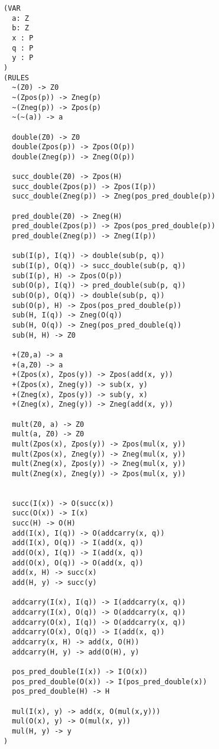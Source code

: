 \begin{lstlisting}[language=trs, caption=Rewriting rule of $\bb{Z}$ and $\bb{P}$ in the TRS format]
(VAR
  a: Z
  b: Z
  x : P
  q : P
  y : P
)
(RULES
  ~(Z0) -> Z0
  ~(Zpos(p)) -> Zneg(p)
  ~(Zneg(p)) -> Zpos(p)
  ~(~(a)) -> a

  double(Z0) -> Z0
  double(Zpos(p)) -> Zpos(O(p))
  double(Zneg(p)) -> Zneg(O(p))
  
  succ_double(Z0) -> Zpos(H)
  succ_double(Zpos(p)) -> Zpos(I(p))
  succ_double(Zneg(p)) -> Zneg(pos_pred_double(p))
  
  pred_double(Z0) -> Zneg(H)
  pred_double(Zpos(p)) -> Zpos(pos_pred_double(p))
  pred_double(Zneg(p)) -> Zneg(I(p))

  sub(I(p), I(q)) -> double(sub(p, q))
  sub(I(p), O(q)) -> succ_double(sub(p, q))
  sub(I(p), H) -> Zpos(O(p))
  sub(O(p), I(q)) -> pred_double(sub(p, q))
  sub(O(p), O(q)) -> double(sub(p, q))
  sub(O(p), H) -> Zpos(pos_pred_double(p))
  sub(H, I(q)) -> Zneg(O(q))
  sub(H, O(q)) -> Zneg(pos_pred_double(q))
  sub(H, H) -> Z0

  +(Z0,a) -> a
  +(a,Z0) -> a
  +(Zpos(x), Zpos(y)) -> Zpos(add(x, y))
  +(Zpos(x), Zneg(y)) -> sub(x, y)
  +(Zneg(x), Zpos(y)) -> sub(y, x)
  +(Zneg(x), Zneg(y)) -> Zneg(add(x, y))
  
  mult(Z0, a) -> Z0
  mult(a, Z0) -> Z0
  mult(Zpos(x), Zpos(y)) -> Zpos(mul(x, y))
  mult(Zpos(x), Zneg(y)) -> Zneg(mul(x, y))
  mult(Zneg(x), Zpos(y)) -> Zneg(mul(x, y))
  mult(Zneg(x), Zneg(y)) -> Zpos(mul(x, y))


  succ(I(x)) -> O(succ(x))
  succ(O(x)) -> I(x)
  succ(H) -> O(H)
  add(I(x), I(q)) -> O(addcarry(x, q))
  add(I(x), O(q)) -> I(add(x, q))
  add(O(x), I(q)) -> I(add(x, q))
  add(O(x), O(q)) -> O(add(x, q))
  add(x, H) -> succ(x)
  add(H, y) -> succ(y)

  addcarry(I(x), I(q)) -> I(addcarry(x, q))
  addcarry(I(x), O(q)) -> O(addcarry(x, q))
  addcarry(O(x), I(q)) -> O(addcarry(x, q))
  addcarry(O(x), O(q)) -> I(add(x, q))
  addcarry(x, H) -> add(x, O(H))
  addcarry(H, y) -> add(O(H), y)
  
  pos_pred_double(I(x)) -> I(O(x))
  pos_pred_double(O(x)) -> I(pos_pred_double(x))
  pos_pred_double(H) -> H
  
  mul(I(x), y) -> add(x, O(mul(x,y)))
  mul(O(x), y) -> O(mul(x, y))
  mul(H, y) -> y
)
\end{lstlisting}


   
